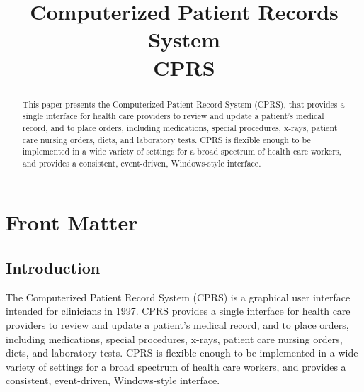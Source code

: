\documentclass{OSEHRAArticle}
\title{Computerized Patient Records System\\CPRS}
\author{}
\newcommand{\OTJhandlerIDnumber}{2}
\begin{document}
%
%
\OTJhandlefooter{\OTJhandlerIDnumber}


\ifpdf
\else
\fi


\maketitle


\ifhtml
\chapter*{Front Matter\label{front}}
\fi


\begin{abstract}
\noindent
This paper presents the Computerized Patient Record System (CPRS), that
provides a single interface for health care providers to review and update a
patient’s medical record, and to place orders, including medications, special
procedures, x-rays, patient care nursing orders, diets, and laboratory tests.
CPRS is flexible enough to be implemented in a wide variety of settings for a
broad spectrum of health care workers, and provides a consistent, event-driven,
Windows-style interface.
\end{abstract}

\tableofcontents

\section{Introduction}

The Computerized Patient Record System (CPRS) is a graphical user interface
intended for clinicians in 1997. CPRS provides a single interface for health
care providers to review and update a patient’s medical record, and to place
orders, including medications, special procedures, x-rays, patient care nursing
orders, diets, and laboratory tests. CPRS is flexible enough to be implemented
in a wide variety of settings for a broad spectrum of health care workers, and
provides a consistent, event-driven, Windows-style interface.
\end{document}
